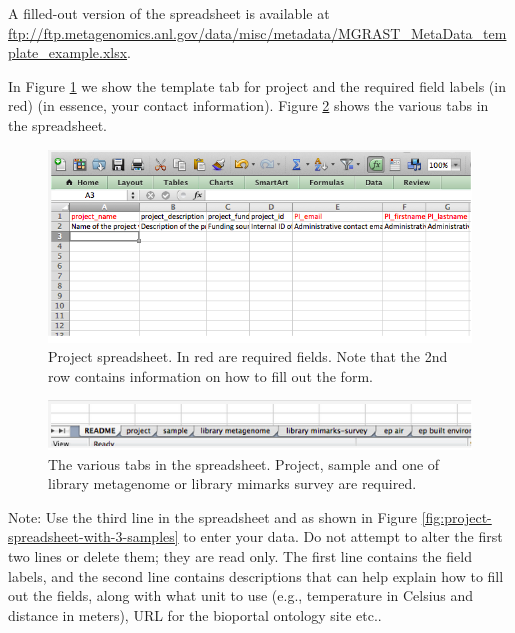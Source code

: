 \documentclass[12pt,fullpage]{report}
\begin{document}
A filled-out version of the spreadsheet is available at \url{ftp://ftp.metagenomics.anl.gov/data/misc/metadata/MGRAST_MetaData_template_example.xlsx}.

In Figure \ref{fig:project-spreadsheet} we show the template tab for project and the required field labels (in red) (in essence, your contact information).
Figure \ref{fig:project-spreadsheet-multiple-tabs} shows the various tabs in the spreadsheet.

\begin{figure}[ht]
\begin{center}
\includegraphics[width=6in]{Images/project-spreadsheet.png}
\end{center}
\caption{
Project spreadsheet. In red are required fields. Note that the 2nd row contains information on how to fill out the form.
}
\label{fig:project-spreadsheet}
\end{figure}

\begin{figure}[ht]
\begin{center}
\includegraphics[width=6in]{Images/project-spreadsheet-multiple-tabs.png}
\end{center}
\caption{
The various tabs in the spreadsheet. Project, sample and one of library metagenome or library mimarks survey are required.
}
\label{fig:project-spreadsheet-multiple-tabs}
\end{figure}

Note: Use the third line in the spreadsheet and as shown in Figure \ref{fig:project-spreadsheet-with-3-samples} to enter your data. Do not attempt to alter the first two lines or delete them; they are read only. The first line contains the field labels, and the second line contains descriptions that can help explain how to fill out the fields, along with what unit to use (e.g., temperature in Celsius and distance in meters), URL for the bioportal ontology site etc..
\end{document}
